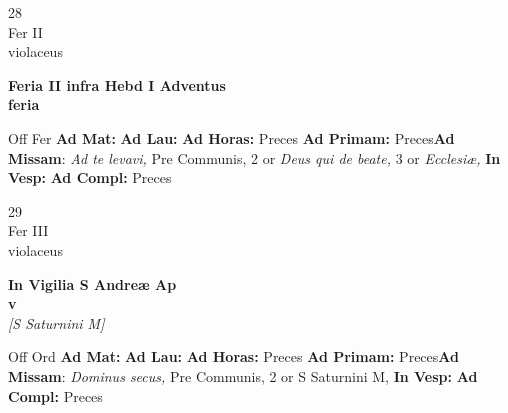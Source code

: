 \documentclass[10pt, openany]{book}
\begin{document}
        \begin{center}
            \begin{minipage}{3.5in}
                \vspace{2em}
                \begin{minipage}{0.5in}
                    {\Huge 28} \\
                    {\normalsize Fer II} \\
                    {\normalsize violaceus}
                \end{minipage}
                \begin{minipage}{3.0in}
                    \textbf{ \large Feria II infra Hebd I Adventus \\
                    \textnormal{\normalsize feria}} \\ 
                \end{minipage}
                \begin{justify}Off Fer
                    \textbf{Ad Mat: }
                    \textbf{Ad Lau: }
                    \textbf{Ad Horas: }Preces
                    \textbf{Ad Primam: }Preces\textbf{Ad Missam}: \textit{Ad te levavi,} Pre Communis, 2 or \textit{Deus qui de beate,} 3 or \textit{Ecclesiæ,}  
                    \textbf{In Vesp: }
                    \textbf{Ad Compl: }Preces
                \end{justify}
            \end{minipage}
        \end{center}
    
        \begin{center}
            \begin{minipage}{3.5in}
                \vspace{2em}
                \begin{minipage}{0.5in}
                    {\Huge 29} \\
                    {\normalsize Fer III} \\
                    {\normalsize violaceus}
                \end{minipage}
                \begin{minipage}{3.0in}
                    \textbf{ \large In Vigilia S Andreæ Ap \\
                    \textnormal{\normalsize v}} \\ \textit{[S Saturnini M]} \\ 
                \end{minipage}
                \begin{justify}Off Ord
                    \textbf{Ad Mat: }
                    \textbf{Ad Lau: }
                    \textbf{Ad Horas: }Preces
                    \textbf{Ad Primam: }Preces\textbf{Ad Missam}: \textit{Dominus secus,} Pre Communis, 2 or S Saturnini M,  
                    \textbf{In Vesp: }
                    \textbf{Ad Compl: }Preces
                \end{justify}
            \end{minipage}
        \end{center}
    
\end{document}
